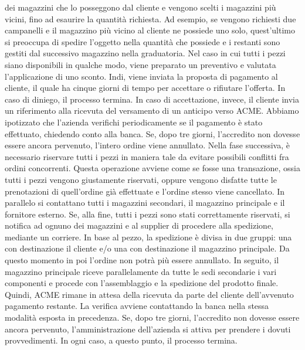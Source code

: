 \documentclass[twoside]{article}
\begin{document}
dei magazzini che lo posseggono dal cliente e vengono scelti i magazzini più vicini, fino ad esaurire la
quantità richiesta. Ad esempio, se vengono richiesti due campanelli e il magazzino più vicino al cliente
ne possiede uno solo, quest'ultimo si preoccupa di spedire l'oggetto nella quantità che possiede e i
restanti sono gestiti dal successivo magazzino nella graduatoria. \newline
Nel caso in cui tutti i pezzi siano disponibili in qualche modo, viene preparato un preventivo e valutata
l'applicazione di uno sconto. Indi, viene inviata la proposta di pagamento al cliente, il quale
ha cinque giorni di tempo per accettare o rifiutare l'offerta. In caso di diniego, il processo termina. In caso
di accettazione, invece, il cliente invia un riferimento alla ricevuta del versamento di un anticipo
verso ACME. Abbiamo ipotizzato che l'azienda verifichi periodicamente se il pagamento è stato
effettuato, chiedendo conto alla banca. Se, dopo tre giorni, l'accredito non dovesse essere ancora pervenuto,
l'intero ordine viene annullato. \newline
Nella fase successiva, è necessario riservare tutti i pezzi in maniera tale da evitare possibili conflitti
fra ordini concorrenti. Questa operazione avviene come se fosse una transazione, ossia tutti i pezzi vengono
giustamente riservati, oppure vengono disfatte tutte le prenotazioni di quell'ordine già effettuate e l'ordine
stesso viene cancellato.
In parallelo si contattano tutti i magazzini secondari, il magazzino principale e il fornitore esterno.
Se, alla fine, tutti i pezzi sono stati correttamente riservati, si notifica ad ognuno dei magazzini e
al supplier di procedere alla spedizione, mediante un corriere.
In base al pezzo, la spedizione è divisa in due gruppi: una con destinazione il cliente e/o
una con destinazione il magazzino principale. 
Da questo momento in poi l'ordine non potrà più essere annullato. \newline
In seguito, il magazzino principale riceve parallelamente da tutte le sedi secondarie i vari componenti
e procede con l'assemblaggio e la spedizione del prodotto finale. Quindi, ACME rimane in attesa
della ricevuta da parte del cliente dell'avvenuto pagamento restante. La verifica avviene contattando
la banca nella stessa modalità esposta in precedenza. Se, dopo tre giorni, l'accredito non dovesse essere
ancora pervenuto, l'amministrazione dell'azienda si attiva per prendere i dovuti provvedimenti.
In ogni caso, a questo punto, il processo termina.
\end{document}
